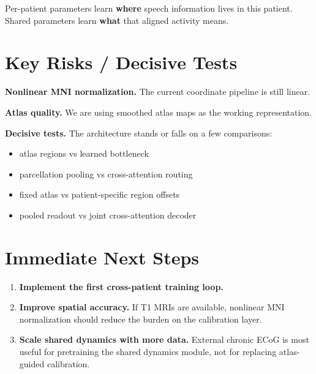 \documentclass[12pt,letterpaper]{article}
\begin{document}
Per-patient parameters learn \textbf{where} speech information lives in this patient. Shared parameters learn \textbf{what} that aligned activity means.


\section{Key Risks / Decisive Tests}

\textbf{Nonlinear MNI normalization.} The current coordinate pipeline is still linear.

\textbf{Atlas quality.} We are using smoothed atlas maps as the working representation.

\textbf{Decisive tests.} The architecture stands or falls on a few comparisons:
\begin{itemize}[leftmargin=2em, itemsep=0.1em]
\item atlas regions vs learned bottleneck
\item parcellation pooling vs cross-attention routing
\item fixed atlas vs patient-specific region offsets
\item pooled readout vs joint cross-attention decoder
\end{itemize}


\section{Immediate Next Steps}

\begin{enumerate}[leftmargin=2em, itemsep=0.15em]
\item \textbf{Implement the first cross-patient training loop.}
\item \textbf{Improve spatial accuracy.} If T1 MRIs are available, nonlinear MNI normalization should reduce the burden on the calibration layer.
\item \textbf{Scale shared dynamics with more data.} External chronic ECoG is most useful for pretraining the shared dynamics module, not for replacing atlas-guided calibration.
\end{enumerate}
\end{document}
